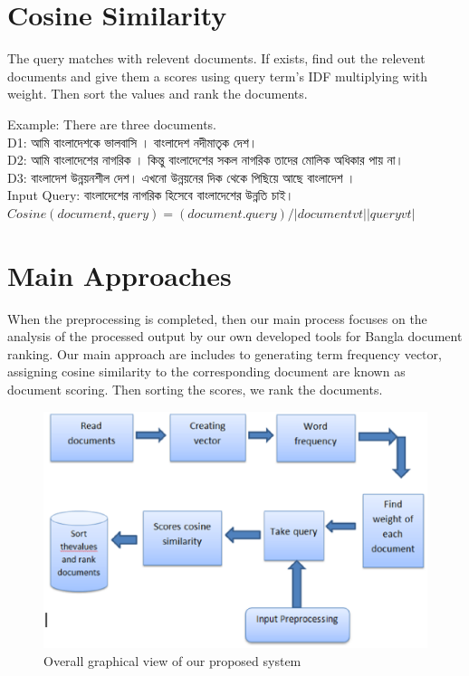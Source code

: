\section{Cosine Similarity}

The query matches with relevent documents. If exists, find out the relevent documents and give them a scores using query term’s IDF multiplying with weight. Then sort the values and rank the documents.

Example:
There are three documents.\\
	D1:   আমি  বাংলাদেশকে ভালবাসি । বাংলাদেশ নদীমাতৃক দেশ। \\
	D2: আমি বাংলাদেশের নাগরিক । কিন্তু বাংলাদেশের সকল  নাগরিক তাদের মোলিক অধিকার পায় না। \\
	D3: বাংলাদেশ উন্নয়নশীল দেশ। এখনো উন্নয়নের দিক থেকে পিছিয়ে আছে বাংলাদেশ ।  \\
Input Query: বাংলাদেশের নাগরিক হিসেবে বাংলাদেশের উন্নতি চাই।\\

\(Cosine(document , query)  = (document . query) / |document vt | |query vt|\)


\section{Main Approaches}

When the preprocessing is completed, then our main process focuses on the analysis of the processed output by our own developed tools for Bangla document ranking. Our main approach are includes to generating term frequency vector, assigning cosine similarity to the corresponding document are known as document scoring. Then sorting the scores, we rank the documents.

\begin{figure}[htp]
	\centering
		\includegraphics[width=.65\textwidth]{figure/five.eps}
	\caption{Overall graphical view of our proposed system}
	\label{Figure:graphical}
\end{figure}

